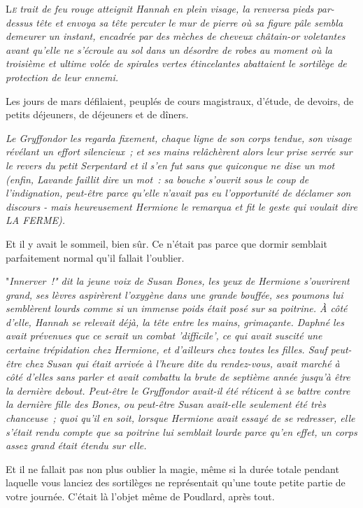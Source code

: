 
\lettrine{L}{\emph{e}} \emph{trait de feu rouge atteignit Hannah en plein visage, la renversa pieds par-dessus tête et envoya sa tête percuter le mur de pierre où sa figure pâle sembla demeurer un instant, encadrée par des mèches de cheveux châtain-or voletantes avant qu'elle ne s'écroule au sol dans un désordre de robes au moment où la troisième et ultime volée de spirales vertes étincelantes abattaient le sortilège de protection de leur ennemi.}

Les jours de mars défilaient, peuplés de cours magistraux, d'étude, de devoirs, de petits déjeuners, de déjeuners et de dîners.

\emph{Le Gryffondor les regarda fixement, chaque ligne de son corps tendue, son visage révélant un effort silencieux~; et ses mains relâchèrent alors leur prise serrée sur le revers du petit Serpentard et il s'en fut sans que quiconque ne dise un mot (enfin, Lavande faillit dire un mot~: sa bouche s'ouvrit sous le coup de l'indignation, peut-être parce qu'elle n'avait pas eu l'opportunité de déclamer son discours - mais heureusement Hermione le remarqua et fit le geste qui voulait dire LA FERME).}

Et il y avait le sommeil, bien sûr. Ce n'était pas parce que dormir semblait parfaitement normal qu'il fallait l'oublier.

"\emph{Innerver~!" dit la jeune voix de Susan Bones, les yeux de Hermione s'ouvrirent grand, ses lèvres aspirèrent l'oxygène dans une grande bouffée, ses poumons lui semblèrent lourds comme si un immense poids était posé sur sa poitrine. À côté d'elle, Hannah se relevait déjà, la tête entre les mains, grimaçante. Daphné les avait prévenues que ce serait un combat 'difficile', ce qui avait suscité une certaine trépidation chez Hermione, et d'ailleurs chez toutes les filles. Sauf peut-être chez Susan qui était arrivée à l'heure dite du rendez-vous, avait marché à côté d'elles sans parler et avait combattu la brute de septième année jusqu'à être la dernière debout. Peut-être le Gryffondor avait-il été réticent à se battre contre la dernière fille des Bones, ou peut-être Susan avait-elle seulement été très chanceuse~; quoi qu'il en soit, lorsque Hermione avait essayé de se redresser, elle s'était rendu compte que sa poitrine lui semblait lourde parce qu'en effet, un corps assez grand était étendu sur elle.}

Et il ne fallait pas non plus oublier la magie, même si la durée totale pendant laquelle vous lanciez des sortilèges ne représentait qu'une toute petite partie de votre journée. C'était là l'objet même de Poudlard, après tout.

